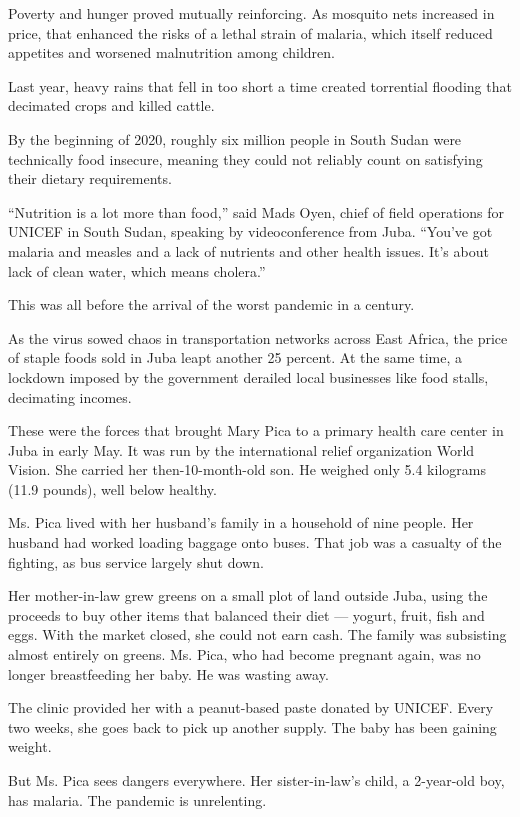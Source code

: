 Poverty and hunger proved mutually reinforcing. As mosquito nets
increased in price, that enhanced the risks of a lethal strain of
malaria, which itself reduced appetites and worsened malnutrition among
children.

Last year, heavy rains that fell in too short a time created torrential
flooding that decimated crops and killed cattle.

By the beginning of 2020, roughly six million people in South Sudan were
technically food insecure, meaning they could not reliably count on
satisfying their dietary requirements.

``Nutrition is a lot more than food,'' said Mads Oyen, chief of field
operations for UNICEF in South Sudan, speaking by videoconference from
Juba. ``You've got malaria and measles and a lack of nutrients and other
health issues. It's about lack of clean water, which means cholera.''

This was all before the arrival of the worst pandemic in a century.

As the virus sowed chaos in transportation networks across East Africa,
the price of staple foods sold in Juba leapt another 25 percent. At the
same time, a lockdown imposed by the government derailed local
businesses like food stalls, decimating incomes.

These were the forces that brought Mary Pica to a primary health care
center in Juba in early May. It was run by the international relief
organization World Vision. She carried her then-10-month-old son. He
weighed only 5.4 kilograms (11.9 pounds), well below healthy.

Ms. Pica lived with her husband's family in a household of nine people.
Her husband had worked loading baggage onto buses. That job was a
casualty of the fighting, as bus service largely shut down.

Her mother-in-law grew greens on a small plot of land outside Juba,
using the proceeds to buy other items that balanced their diet ---
yogurt, fruit, fish and eggs. With the market closed, she could not earn
cash. The family was subsisting almost entirely on greens. Ms. Pica, who
had become pregnant again, was no longer breastfeeding her baby. He was
wasting away.

The clinic provided her with a peanut-based paste donated by UNICEF.
Every two weeks, she goes back to pick up another supply. The baby has
been gaining weight.

But Ms. Pica sees dangers everywhere. Her sister-in-law's child, a
2-year-old boy, has malaria. The pandemic is unrelenting.

